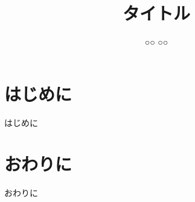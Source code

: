 ﻿\documentclass[twocolumn,a4paper,9pt]{jsarticle}
\title{タイトル}
\author{○○ ○○}
\begin{document}
\setlength{\baselineskip}{14.2pt}
\papertitle


\section{はじめに}
はじめに
\cite{en}
\cite{jp}

\section{おわりに}
おわりに\

{\small


}
\end{document}
